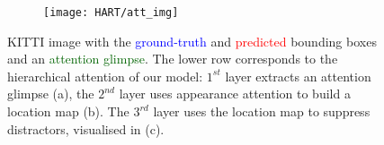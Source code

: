     
\begin{figure}[ht!]
	\centering
	\begin{minipage}[c]{0.67\textwidth}
		\centering
        \begin{subfigure}[b]{1.\textwidth}
      		 \centering
             \texttt{[image: HART/att\_img]}
        \end{subfigure}
        \begin{minipage}{.85\textwidth}
        	\centering
            \begin{subfigure}[b]{.29\textwidth}
            \end{subfigure}
            \hfill
            \hspace{8pt}
            \begin{subfigure}[b]{.29\textwidth}
            \end{subfigure}
            \hfill
            \hspace{5pt}
            \begin{subfigure}[b]{.29\textwidth}
            \end{subfigure}
        \end{minipage}
	\end{minipage}
	\begin{minipage}[c]{0.2\textwidth}
   		\caption{KITTI image with the \textcolor{blue}{ground-truth} and \textcolor{red}{predicted} bounding boxes and an \textcolor{darkgreen}{attention glimpse}. The lower row corresponds to the hierarchical attention of our model: $1^{st}$ layer extracts an attention glimpse (a), the $2^{nd}$ layer uses appearance attention to build a location map (b). The $3^{rd}$ layer uses the location map to suppress distractors, visualised in (c).}
        \label{fig:img_with_att}
	\end{minipage}
\end{figure}
    
